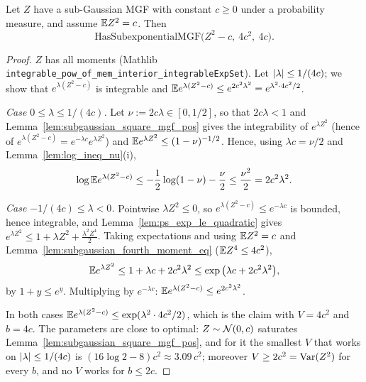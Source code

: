 \begin{lemma}
\label{lem:subgaussian_square_subexp}
\leanok
{}
Let $Z$ have a sub-Gaussian MGF with constant $c \ge 0$ under a probability measure, and
assume $\mathbb{E} Z^2 = c$. Then
\[
  \mathrm{HasSubexponentialMGF}\big(Z^2 - c,\ 4c^2,\ 4c\big).
\]
\end{lemma}

\begin{proof}
\leanok
{}
$Z$ has all moments (Mathlib \texttt{integrable\_pow\_of\_mem\_interior\_integrableExpSet}).
Let $\lvert \lambda \rvert \le 1/(4c)$; we show that $e^{\lambda(Z^2 - c)}$ is integrable and
$\mathbb{E} e^{\lambda(Z^2 - c)} \le e^{2c^2\lambda^2} = e^{\lambda^2\cdot4c^2/2}$.

\emph{Case $0 \le \lambda \le 1/(4c)$.} Let $\nu := 2c\lambda \in [0, 1/2]$, so that
$2c\lambda < 1$ and Lemma~\ref{lem:subgaussian_square_mgf_pos} gives the integrability of
$e^{\lambda Z^2}$ (hence of $e^{\lambda(Z^2-c)} = e^{-\lambda c}e^{\lambda Z^2}$) and
$\mathbb{E} e^{\lambda Z^2} \le (1-\nu)^{-1/2}$. Hence, using $\lambda c = \nu/2$ and
Lemma~\ref{lem:log_ineq_nu}(i),
\[
  \log\mathbb{E} e^{\lambda(Z^2 - c)} \le -\frac12\log(1-\nu) - \frac{\nu}{2} \le \frac{\nu^2}{2} = 2c^2\lambda^2 .
\]

\emph{Case $-1/(4c) \le \lambda < 0$.} Pointwise $\lambda Z^2 \le 0$, so
$e^{\lambda(Z^2-c)} \le e^{-\lambda c}$ is bounded, hence integrable, and
Lemma~\ref{lem:ps_exp_le_quadratic} gives $e^{\lambda Z^2} \le 1 + \lambda Z^2 + \frac{\lambda^2Z^4}{2}$.
Taking expectations and using $\mathbb{E} Z^2 = c$ and Lemma~\ref{lem:subgaussian_fourth_moment_eq}
($\mathbb{E} Z^4 \le 4c^2$),
\[
  \mathbb{E} e^{\lambda Z^2} \le 1 + \lambda c + 2c^2\lambda^2
  \le \exp\big(\lambda c + 2c^2\lambda^2\big),
\]
by $1 + y \le e^y$. Multiplying by $e^{-\lambda c}$:
$\mathbb{E} e^{\lambda(Z^2 - c)} \le e^{2c^2\lambda^2}$.

In both cases $\mathbb{E} e^{\lambda(Z^2-c)} \le \exp(\lambda^2\cdot4c^2/2)$, which is the claim with
$V = 4c^2$ and $b = 4c$. The parameters are close to optimal: $Z \sim \mathcal{N}(0,c)$ saturates
Lemma~\ref{lem:subgaussian_square_mgf_pos}, and for it the smallest $V$ that works on
$\lvert \lambda \rvert \le 1/(4c)$ is $(16\log2-8)c^2 \approx 3.09\,c^2$; moreover $V \ge 2c^2 = \mathrm{Var}(Z^2)$
for every $b$, and no $V$ works for $b \le 2c$.
\end{proof}

